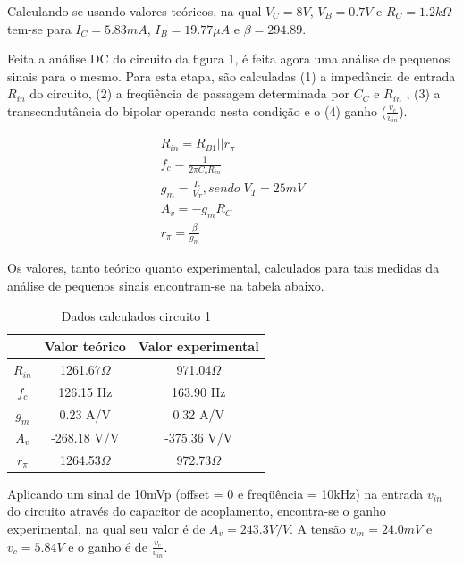 \documentclass[a4paper]{article} %
\begin{document}
Calculando-se usando valores teóricos, na qual $V_C=8V$, $V_B=0.7V$ e $R_C=1.2k\Omega$ tem-se para  $I_C=5.83mA$, $I_B=19.77\mu A$ e $\beta=294.89$.

Feita a análise DC do circuito da figura 1, é feita agora uma análise de pequenos sinais para o mesmo. Para esta etapa, são calculadas (1) a impedância de entrada $R_{in}$ do circuito, (2) a freqüência de passagem determinada por $C_C$ e $R_{in}$ , (3) a transcondutância do bipolar operando nesta condição e o (4) ganho ($\frac{v_c}{v_{in}}$).



\vspace{3mm}


\begin{eqnarray}
R_{in}=R_{B1}||r_{\pi}\\
f_c=\frac{1}{2\pi C_cR_{in}}\\
g_m=\frac{I_c}{V_T},sendo \; V_T = 25 mV\\
A_v=-g_mR_C\\
r_{\pi}=\frac{\beta}{g_m}
\end{eqnarray}


Os valores, tanto teórico quanto experimental, calculados para tais medidas da análise
de pequenos sinais encontram-se na tabela abaixo.
\begin{table}[h!]
\begin{centering}
\begin{tabular}{ccc}
\hline 
 & Valor teórico & Valor experimental\tabularnewline
\hline
\hline 
$R_{in}$ & 1261.67$\Omega$ & 971.04$\Omega$\tabularnewline
$f_{c}$ & 126.15 Hz & 163.90 Hz\tabularnewline
$g_{m}$ & 0.23 A/V & 0.32 A/V\tabularnewline
$A_{v}$ & -268.18 V/V & -375.36 V/V\tabularnewline
$r_{\pi}$ & 1264.53$\Omega$ & 972.73$\Omega$\tabularnewline
\hline
\end{tabular}
\par\end{centering}

\caption{Dados calculados circuito 1}

\end{table}


Aplicando um sinal de 10mVp (offset = 0 e freqüência = 10kHz) na entrada
$v_{in}$ do circuito através do capacitor de acoplamento, encontra-se o ganho experimental, na
qual seu valor é de $A_v=243.3 V/V$. A tensão $v_{in}=24.0mV$ e $v_c=5.84V$
e o ganho é de $\frac{v_c}{v_{in}}$.
\end{document}
